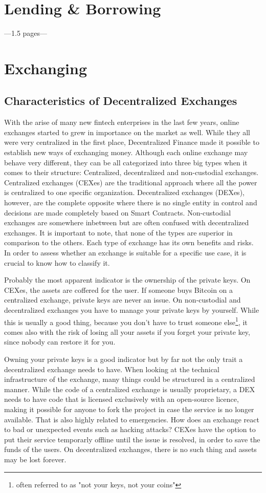 \section{Lending \& Borrowing}
---1.5 pages---

\section{Exchanging}
\subsection{Characteristics of Decentralized Exchanges}
With the arise of many new fintech enterprises in the last few years, online exchanges started to grew in importance on the market as well. While they all were very centralized in the first place, Decentralized Finance made it possible to establish new ways of exchanging money. Although each online exchange may behave very different, they can be all categorized into three big types when it comes to their structure: Centralized, decentralized and non-custodial exchanges. Centralized exchanges (CEXes) are the traditional approach where all the power is centralized to one specific organization. Decentralized exchanges (DEXes), however, are the complete opposite where there is no single entity in control and decisions are made completely based on Smart Contracts. Non-custodial exchanges are somewhere inbetween but are often confused with decentralized exchanges. It is important to note, that none of the types are superior in comparison to the others. Each type of exchange has its own benefits and risks. In order to assess whether an exchange is suitable for a specific use case, it is crucial to know how to classify it.

Probably the most apparent indicator is the ownership of the private keys. On CEXes, the assets are coffered for the user. If someone buys Bitcoin on a centralized exchange, private keys are never an issue. On non-custodial and decentralized exchanges you have to manage your private keys by yourself. While this is usually a good thing, because you don't have to trust someone else\footnote{often referred to as "not your keys, not your coins"}, it comes also with the risk of losing all your assets if you forget your private key, since nobody can restore it for you.

Owning your private keys is a good indicator but by far not the only trait a decentralized exchange needs to have. When looking at the technical infrastructure of the exchange, many things could be structured in a centralized manner. While the code of a centralized exchange is usually proprietary, a DEX needs to have code that is licensed exclusively with an open-source licence, making it possible for anyone to fork the project in case the service is no longer available. That is also highly related to emergencies. How does an exchange react to bad or unexpected events such as hacking attacks? CEXes have the option to put their service temporarly offline until the issue is resolved, in order to save the funds of the users. On decentralized exchanges, there is no such thing and assets may be lost forever.


